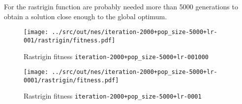 For the rastrigin function are probably needed more than 5000 generations to obtain a solution close enough to the global optimum.

\begin{figure}[H]
	\centering
	\begin{minipage}[b]{.6\textwidth}
		\texttt{[image: ../src/out/nes/iteration-2000+pop\_size-5000+lr-001/rastrigin/fitness.pdf]}	
	\end{minipage}
	\caption{Rastrigin fitness \texttt{iteration-2000+pop\_size-5000+lr-001000}}
	\label{fig:nes-r-fitness/001}
\end{figure}
\begin{figure}[H]
	\centering
	\begin{minipage}[b]{.6\textwidth}
		\texttt{[image: ../src/out/nes/iteration-2000+pop\_size-5000+lr-0001/rastrigin/fitness.pdf]}	
	\end{minipage}
	\caption{Rastrigin fitness \texttt{iteration-2000+pop\_size-5000+lr-0001}}
	\label{fig:nes-r-fitness/0001}
\end{figure}
